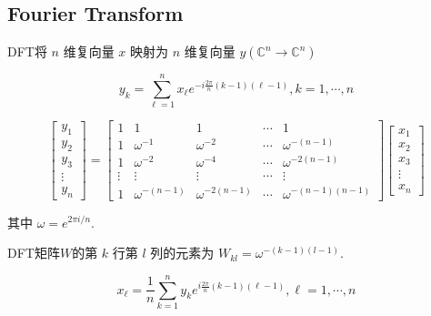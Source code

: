 \subsection{Fourier Transform}

\begin{definition}
    DFT将 $ n $ 维复向量 $ x $ 映射为 $ {n} $ 维复向量 $ y\left(\mathbb{C}^{n} \rightarrow \mathbb{C}^{n}\right) $

    \begin{equation} y_{k}=\sum_{\ell=1}^{n} x_{\ell} e^{-i \frac{2 \pi}{n}(k-1)(\ell-1)}, k=1, \cdots, n \end{equation}

    \begin{equation} \left[\begin{array}{c}y_{1} \\ y_{2} \\ y_{3} \\ \vdots \\ y_{n}\end{array}\right]=\left[\begin{array}{ccccc}1 & 1 & 1 & \cdots & 1 \\ 1 & \omega^{-1} & \omega^{-2} & \cdots & \omega^{-(n-1)} \\ 1 & \omega^{-2} & \omega^{-4} & \cdots & \omega^{-2(n-1)} \\ \vdots & \vdots & \vdots & \cdots & \vdots \\ 1 & \omega^{-(n-1)} & \omega^{-2(n-1)} & \cdots & \omega^{-(n-1)(n-1)}\end{array}\right]\left[\begin{array}{c}x_{1} \\ x_{2} \\ x_{3} \\ \vdots \\ x_{n}\end{array}\right] \end{equation}

   其中 $ \omega=e^{2 \pi i / n} $.
\end{definition}

DFT矩阵$W$的第 $ k $ 行第 $ l $ 列的元素为 $ W_{k l}=\omega^{-(k-1)(l-1)} $.

\begin{definition}
    \begin{equation} x_{\ell}=\frac{1}{n} \sum_{k=1}^{n} y_{k} e^{i \frac{2 \pi}{n}(k-1)(\ell-1)}, \ell=1, \cdots, n \end{equation}
\end{definition}

